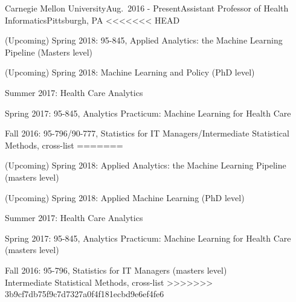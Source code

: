 \begin{rSubsection}{Carnegie Mellon University}{Aug.\ 2016 - Present}{Assistant Professor of Health Informatics}{Pittsburgh, PA}
<<<<<<< HEAD
\item (Upcoming) Spring 2018: 95-845, Applied Analytics: the Machine Learning Pipeline (Masters level)
\item (Upcoming) Spring 2018: Machine Learning and Policy (PhD level)
\item Summer 2017: Health Care Analytics
\item Spring 2017: 95-845, Analytics Practicum: Machine Learning for Health Care
\item Fall 2016: 95-796/90-777, Statistics for IT Managers/Intermediate Statistical Methods, cross-list
=======
\item (Upcoming) Spring 2018: Applied Analytics: the Machine Learning Pipeline (masters level)
\item (Upcoming) Spring 2018: Applied Machine Learning (PhD level)
\item Summer 2017: Health Care Analytics
\item Spring 2017: 95-845, Analytics Practicum: Machine Learning for Health Care (masters level)
\item Fall 2016: 95-796, Statistics for IT Managers (masters level)
\\ \qquad Intermediate Statistical Methods, cross-list
>>>>>>> 3b9cf7db75f9c7d7327a0f4f181ecbd9e6ef4fe6
\end{rSubsection}



